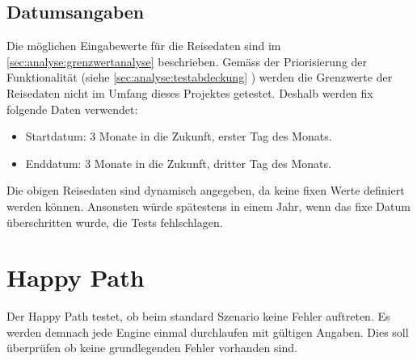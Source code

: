 \subsection{Datumsangaben}
Die möglichen Eingabewerte für die Reisedaten sind im \cref{sec:analyse:grenzwertanalyse}  beschrieben.
Gemäss der Priorisierung der Funktionalität (siehe  \cref{sec:analyse:testabdeckung} ) werden die Grenzwerte der Reisedaten nicht im Umfang dieses Projektes getestet. Deshalb werden fix folgende Daten verwendet:

\begin{itemize}
\item Startdatum: 3 Monate in die Zukunft, erster Tag des Monats.
\item Enddatum: 3 Monate in die Zukunft, dritter Tag des Monats.
\end{itemize}
\vspace{0 mm}
Die obigen Reisedaten sind dynamisch angegeben, da keine fixen Werte definiert werden können. Ansonsten würde spätestens in einem Jahr, wenn das fixe Datum überschritten wurde, die Tests fehlschlagen.

\section{Happy Path}
Der Happy Path testet, ob beim standard Szenario keine Fehler auftreten. Es werden demnach jede Engine einmal durchlaufen mit gültigen Angaben. Dies soll überprüfen ob keine grundlegenden Fehler vorhanden sind.
